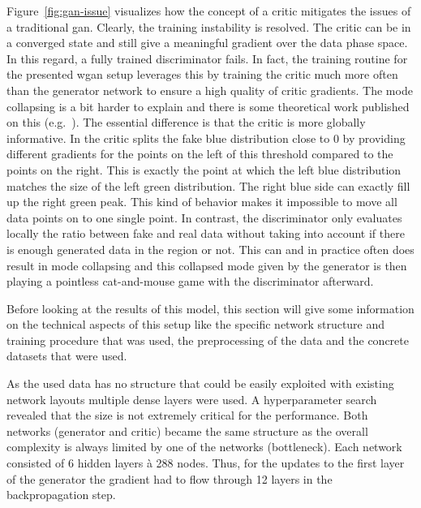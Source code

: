 Figure~\ref{fig:gan-issue} visualizes how the concept of a critic mitigates the issues of a traditional \gls{gan}. Clearly, the training instability is resolved. The critic can be in a converged state and still give a meaningful gradient over the data phase space. In this regard, a fully trained discriminator fails. In fact, the training routine for the presented \gls{wgan} setup leverages this by training the critic much more often than the generator network to ensure a high quality of critic gradients. The mode collapsing is a bit harder to explain and there is some theoretical work published on this (e.g.~\cite{dragan}). The essential difference is that the critic is more globally informative. In  the critic splits the fake blue distribution close to 0 by providing different gradients for the points on the left of this threshold compared to the points on the right. This is exactly the point at which the left blue distribution matches the size of the left green distribution. The right blue side can exactly fill up the right green peak. This kind of behavior makes it impossible to move all data points on to one single point. In contrast, the discriminator only evaluates locally the ratio between fake and real data without taking into account if there is enough generated data in the region or not. This can and in practice often does result in mode collapsing and this collapsed mode given by the generator is then playing a pointless cat-and-mouse game with the discriminator afterward.


Before looking at the results of this model, this section will give some information on the technical aspects of this setup like the specific network structure and training procedure that was used, the preprocessing of the data and the concrete datasets that were used.


As the used data has no structure that could be easily exploited with existing network layouts multiple dense layers were used. A hyperparameter search revealed that the size is not extremely critical for the performance. Both networks (generator and critic) became the same structure as the overall complexity is always limited by one of the networks (bottleneck). Each network consisted of 6 hidden layers \`a 288 nodes. Thus, for the updates to the first layer of the generator the gradient had to flow through 12 layers in the backpropagation step.

